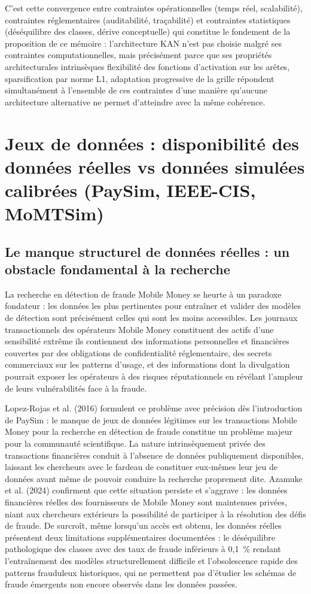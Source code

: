 \documentclass[11pt,a4paper,oneside]{report}
\theoremstyle{definition}
\theoremstyle{remark}
\begin{document}
C'est cette convergence entre contraintes opérationnelles (temps réel, scalabilité), contraintes réglementaires (auditabilité, traçabilité) et contraintes statistiques (déséquilibre des classes, dérive conceptuelle) qui constitue le fondement de la proposition de ce mémoire : l'architecture KAN n'est pas choisie malgré ses contraintes computationnelles, mais précisément parce que ses propriétés architecturales intrinsèques  flexibilité des fonctions d'activation sur les arêtes, sparsification par norme L1, adaptation progressive de la grille  répondent simultanément à l'ensemble de ces contraintes d'une manière qu'aucune architecture alternative ne permet d'atteindre avec la même cohérence.

\section{Jeux de données : disponibilité des données réelles vs données simulées calibrées (PaySim, IEEE-CIS, MoMTSim)}

\subsection{Le manque structurel de données réelles : un obstacle fondamental à la recherche}

La recherche en détection de fraude Mobile Money se heurte à un paradoxe fondateur : les données les plus pertinentes pour entraîner et valider des modèles de détection sont précisément celles qui sont les moins accessibles. Les journaux transactionnels des opérateurs Mobile Money constituent des actifs d'une sensibilité extrême  ils contiennent des informations personnelles et financières couvertes par des obligations de confidentialité réglementaire, des secrets commerciaux sur les patterns d'usage, et des informations dont la divulgation pourrait exposer les opérateurs à des risques réputationnels en révélant l'ampleur de leurs vulnérabilités face à la fraude.

Lopez-Rojas et al. (2016) formulent ce problème avec précision dès l'introduction de PaySim : le manque de jeux de données légitimes sur les transactions Mobile Money pour la recherche en détection de fraude constitue un problème majeur pour la communauté scientifique. La nature intrinsèquement privée des transactions financières conduit à l'absence de données publiquement disponibles, laissant les chercheurs avec le fardeau de constituer eux-mêmes leur jeu de données avant même de pouvoir conduire la recherche proprement dite. Azamuke et al. (2024) confirment que cette situation persiste et s'aggrave : les données financières réelles des fournisseurs de Mobile Money sont maintenues privées, niant aux chercheurs extérieurs la possibilité de participer à la résolution des défis de fraude. De surcroît, même lorsqu'un accès est obtenu, les données réelles présentent deux limitations supplémentaires documentées : le déséquilibre pathologique des classes  avec des taux de fraude inférieurs à 0,1~\% rendant l'entraînement des modèles structurellement difficile  et l'obsolescence rapide des patterns frauduleux historiques, qui ne permettent pas d'étudier les schémas de fraude émergents non encore observés dans les données passées.
\end{document}
